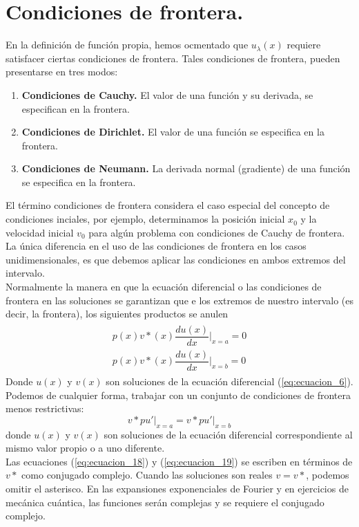 \section{Condiciones de frontera.}
En la definición de función propia, hemos ocmentado que $u_{\lambda} (x)$ requiere satisfacer ciertas condiciones de frontera. Tales condiciones de frontera, pueden presentarse en tres modos:
\begin{enumerate}
\item \textbf{Condiciones de Cauchy. } El valor de una función y su derivada, se especifican en la frontera. 
\item \textbf{Condiciones de Dirichlet. }El valor de una función se especifica en la frontera.
\item \textbf{Condiciones de Neumann. } La derivada normal (gradiente) de una función se especifica en la frontera.
\end{enumerate}
El término condiciones de frontera considera el caso especial del concepto de condiciones inciales, por ejemplo, determinamos la posición inicial $x_{0}$ y la velocidad inicial $v_{0}$ para algún problema con condiciones de Cauchy de frontera. La única diferencia en el uso de las condiciones de frontera en los casos unidimensionales, es que debemos aplicar las condiciones en ambos extremos del intervalo.
\\
Normalmente la manera en que la ecuación diferencial o las condiciones de frontera en las soluciones se garantizan que e los extremos de nuestro intervalo (es decir, la frontera), los siguientes productos se anulen
\begin{eqnarray}
\begin{aligned}
p(x) v*(x) \dfrac{d u(x)}{dx} \vert_{x=a} = 0 \\
p(x) v*(x) \dfrac{d u(x)}{dx} \vert_{x=b} = 0
\label{eq:ecuacion_18}
\end{aligned}
\end{eqnarray}
Donde $u(x)$ y $v(x)$ son soluciones de la ecuación diferencial (\ref{eq:ecuacion_6}). Podemos de cualquier forma, trabajar con un conjunto de condiciones de frontera menos restrictivas:
\begin{equation}
v* p u' \vert_{x=a} =  v* p u' \vert_{x=b} \label{eq:ecuacion_19}
\end{equation}
donde $u(x)$ y $v(x)$ son soluciones de la ecuación diferencial correspondiente al mismo valor propio o a uno diferente. 
\\
Las ecuaciones (\ref{eq:ecuacion_18}) y (\ref{eq:ecuacion_19}) se escriben en términos de $v*$ como conjugado complejo. Cuando las soluciones son reales $v=v*$, podemos omitir el asterisco. En las expansiones exponenciales de Fourier y en ejercicios de mecánica cuántica, las funciones serán complejas y se requiere el conjugado complejo.
